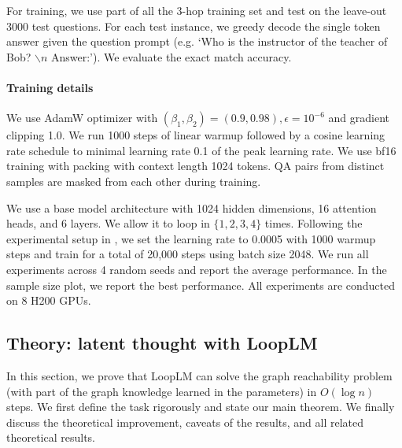 \documentclass[]{bytedance_seed}
\newcommand{\1}{\mathbf{1}}
\newcommand{\ut}{LoopLM}
\begin{document}
For training, we use part of all the 3-hop training set and test on the leave-out 3000 test questions. For each test instance, we greedy decode the single token answer given the question prompt (e.g. `Who is the instructor of the teacher of Bob? $\backslash n$ Answer:'). We evaluate the exact match accuracy.


\paragraph{Training details} We use AdamW optimizer with $(\beta_1,\beta_2)=(0.9,0.98), \epsilon=10^{-6}$ and gradient clipping 1.0. We run 1000 steps of linear warmup followed by a cosine learning rate schedule to minimal learning rate 0.1 of the peak learning rate. We use bf16 training with packing with context length 1024 tokens. QA pairs from distinct samples are masked from each other during training.

We use a base model architecture with 1024 hidden dimensions, 16 attention heads, and 6 layers. We allow it to loop in $\{1,2,3,4\}$ times. Following the experimental setup in \cite{yao2025language}, we set the learning rate to 0.0005 with 1000 warmup steps and train for a total of 20,000 steps using batch size 2048. We run all experiments across 4 random seeds and report the average performance. In the sample size plot, we report the best performance. All experiments are conducted on 8 H200 GPUs.


\subsection{Theory: latent thought with \ut{}}
\label{appendix:theory}
In this section, we prove that \ut{} can solve the graph reachability problem (with part of the graph knowledge learned in the parameters) in $O(\log n)$ steps. We first define the task rigorously and state our main theorem. We finally discuss the theoretical improvement, caveats of the results, and all related theoretical results.
\end{document}
